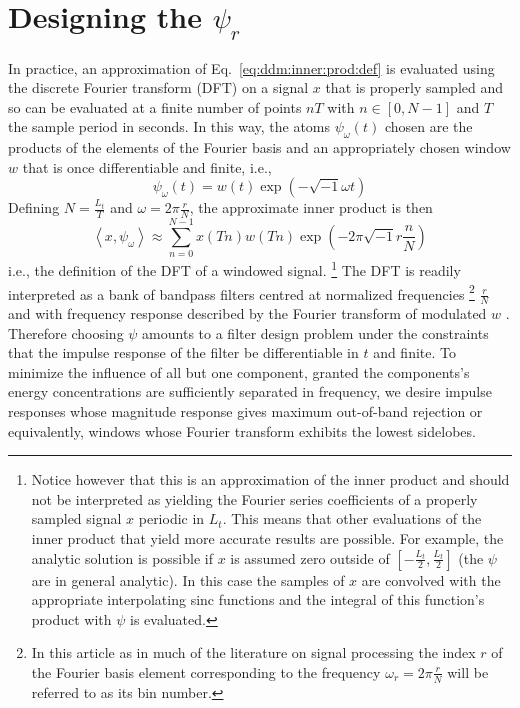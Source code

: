 \documentclass[twoside,a4paper]{article}
\begin{document}
\section{Designing the $\psi_{r}$}
\label{sec:designingatoms}

In practice, an approximation of Eq.~\ref{eq:ddm:inner:prod:def} is evaluated using
the discrete Fourier transform (DFT) on a signal $x$ that is properly sampled
and so can be evaluated at a finite number of points $nT$ with $n \in [0,N-1]$ and
$T$ the sample period in seconds. In this way, the atoms $\psi_{\omega}(t)$ chosen
are the products of the elements of the Fourier basis and an appropriately
chosen window $w$ that is once differentiable and finite, i.e.,
%
\[
    \psi_{\omega}(t) = w(t) \exp(-\sqrt{-1} \omega t)
\]
%
Defining $N = \frac{L_{t}}{T}$ and $\omega = 2
\pi \frac{r}{N}$, the approximate
inner product is then
%
\[
    \left\langle x , \psi_{\omega} \right\rangle \approx 
    \sum_{n=0}^{N-1} x(Tn) w(Tn) \exp(-2 \pi \sqrt{-1} r \frac{n}{N}) 
\]
%
i.e., the definition of the DFT of a windowed signal.%
\footnote{%
    Notice however that this is an approximation of the inner product and should
    not be interpreted as yielding the Fourier series coefficients of a properly
    sampled signal $x$ periodic in $L_{t}$. This means that other
    evaluations of the inner product that yield more accurate results are
    possible. For example, the analytic solution is possible if $x$ is assumed
    zero outside of $[-\frac{L_{t}}{2},\frac{L_{t}}{2}]$ (the $\psi$ are in
    general analytic).  In this case the samples of $x$ are convolved with the
    appropriate interpolating sinc functions and the integral of this function's
    product with $\psi$ is evaluated.
}%
The DFT is readily interpreted as a bank of bandpass filters centred at
normalized frequencies%
\footnote{%
In this article as in much of the literature on signal processing the index $r$
of the Fourier basis element corresponding to the frequency $\omega_{r} = 2 \pi
\frac{r}{N}$ will be referred to as its bin number.
}
$\frac{r}{N}$ and with frequency response described by the Fourier transform of
modulated $w$ \cite{allen1977unified}. Therefore choosing $\psi$ amounts to a
filter design problem under the constraints that the impulse response of the
filter be differentiable in $t$ and finite. To minimize the influence of all but
one component, granted the components's energy concentrations are sufficiently
separated in frequency, we desire impulse responses whose magnitude response
gives maximum out-of-band rejection or equivalently, windows whose Fourier
transform exhibits the lowest sidelobes.
\end{document}
